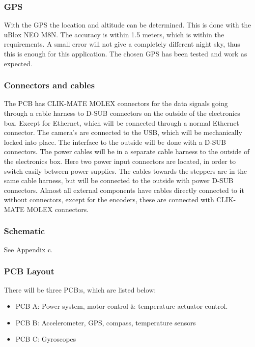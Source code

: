 {\subsubsection{GPS}
With the GPS the location and altitude can be determined. This is done with the uBlox NEO M8N. The accuracy is within 1.5 meters, which is within the requirements. A small error will not give a completely different night sky, thus this is enough for this application. The chosen GPS has been tested and work as expected.

\subsubsection{Connectors and cables}
The PCB has CLIK-MATE MOLEX connectors for the data signals going through a cable harness to D-SUB connectors on the outside of the electronics box. Except for Ethernet, which will be connected through a normal Ethernet connector. The camera's are connected to the USB, which will be mechanically locked into place. The interface to the outside will be done with a D-SUB connectors. The power cables will be in a separate cable harness to the outside of the electronics box. Here two power input connectors are located, in order to switch easily between power supplies. The cables towards the steppers are in the same cable harness, but will be connected to the outside with power D-SUB connectors. Almost all external components have cables directly connected to it without connectors, except for the encoders, these are connected with CLIK-MATE MOLEX connectors.


\subsubsection{Schematic}
See Appendix c.

\subsubsection{PCB Layout}
There will be three PCB:s, which are listed below:

\begin{itemize}
	\item 	PCB A: Power system, motor control \& temperature actuator control.
	\item	PCB B: Accelerometer, GPS, compass, temperature sensors
	\item 	PCB C: Gyroscopes
\end{itemize}


}
